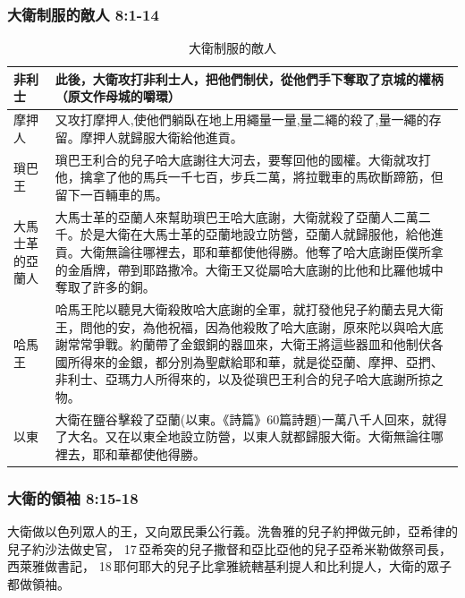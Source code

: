 \subsubsection{大衛制服的敵人 8:1-14}
\begin{table}[!hbp]
\centering 
\begin{tabular}{p{1.2cm}|p{16.3cm}}
\hline
\hline
非利士&此後，大衛攻打非利士人，把他們制伏，從他們手下奪取了京城的權柄（原文作母城的嚼環） \\\hline
摩押人&又攻打摩押人,使他們躺臥在地上用繩量一量,量二繩的殺了,量一繩的存留。摩押人就歸服大衛給他進貢。\\\hline
瑣巴王&瑣巴王利合的兒子哈大底謝往大河去，要奪回他的國權。大衛就攻打他，擒拿了他的馬兵一千七百，步兵二萬，將拉戰車的馬砍斷蹄筋，但留下一百輛車的馬。\\\hline
大馬士革的亞蘭人&大馬士革的亞蘭人來幫助瑣巴王哈大底謝，大衛就殺了亞蘭人二萬二千。於是大衛在大馬士革的亞蘭地設立防營，亞蘭人就歸服他，給他進貢。大衛無論往哪裡去，耶和華都使他得勝。他奪了哈大底謝臣僕所拿的金盾牌，帶到耶路撒冷。大衛王又從屬哈大底謝的比他和比羅他城中奪取了許多的銅。\\\hline
哈馬王&哈馬王陀以聽見大衛殺敗哈大底謝的全軍，就打發他兒子約蘭去見大衛王，問他的安，為他祝福，因為他殺敗了哈大底謝，原來陀以與哈大底謝常常爭戰。約蘭帶了金銀銅的器皿來，大衛王將這些器皿和他制伏各國所得來的金銀，都分別為聖獻給耶和華，就是從亞蘭、摩押、亞捫、非利士、亞瑪力人所得來的，以及從瑣巴王利合的兒子哈大底謝所掠之物。 \\\hline
以東&大衛在鹽谷擊殺了亞蘭(以東。《詩篇》60篇詩題)一萬八千人回來，就得了大名。又在以東全地設立防營，以東人就都歸服大衛。大衛無論往哪裡去，耶和華都使他得勝。\\\hline
\end{tabular}
\caption{大衛制服的敵人}
\end{table}

\subsubsection{大衛的領袖 8:15-18}
大衛做以色列眾人的王，又向眾民秉公行義。洗魯雅的兒子約押做元帥，亞希律的兒子約沙法做史官， 17 亞希突的兒子撒督和亞比亞他的兒子亞希米勒做祭司長，西萊雅做書記， 18 耶何耶大的兒子比拿雅統轄基利提人和比利提人，大衛的眾子都做領袖。

